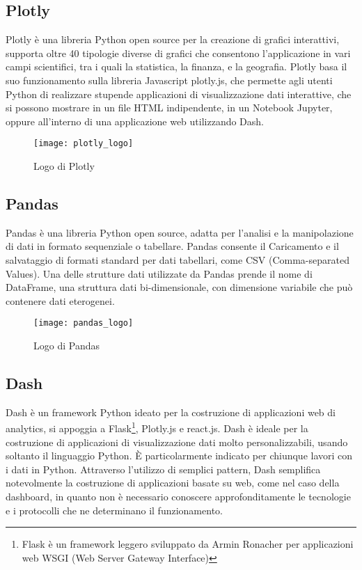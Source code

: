 \subsection{Plotly}

Plotly è una libreria Python open source  per la creazione di grafici interattivi, supporta oltre 40 tipologie diverse di grafici che consentono l’applicazione in vari campi scientifici, tra i quali la statistica, la finanza, e la geografia.
Plotly basa il suo funzionamento sulla libreria Javascript plotly.js, che permette agli utenti Python di realizzare stupende applicazioni di visualizzazione dati interattive, che si possono mostrare in un file HTML indipendente, in un Notebook Jupyter\footnotemark, oppure all’interno di una applicazione web utilizzando Dash.

\begin{figure}[htp]
    \centering
    \texttt{[image: plotly\_logo]}
    \caption{Logo di Plotly}
\end{figure}

\subsection{Pandas}
Pandas è una libreria Python open source, adatta per l’analisi e la manipolazione di dati in formato sequenziale o tabellare.
Pandas consente il Caricamento e il salvataggio di formati standard per dati tabellari, come CSV (Comma-separated Values).
Una delle strutture dati utilizzate da Pandas prende il nome di DataFrame, una struttura dati bi-dimensionale, con dimensione variabile che può contenere dati eterogenei.
\begin{figure}[htp]
    \centering
    \texttt{[image: pandas\_logo]}
    \caption{Logo di Pandas}
\end{figure}

\subsection{Dash}
Dash è un framework Python ideato per la costruzione di applicazioni web di analytics, si appoggia a Flask\footnote{Flask è un framework leggero sviluppato da Armin Ronacher per applicazioni web WSGI
(Web Server Gateway Interface)}, Plotly.js e react.js\footnotemark.
Dash è ideale per la costruzione di applicazioni di visualizzazione dati molto personalizzabili, usando soltanto il linguaggio Python. 
È particolarmente indicato per chiunque lavori con i dati in Python.
Attraverso l’utilizzo di semplici pattern, Dash semplifica notevolmente la costruzione di applicazioni basate su web, come nel caso della dashboard, in quanto non è necessario conoscere approfonditamente le tecnologie e i protocolli che ne determinano il funzionamento.


